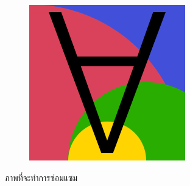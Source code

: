 \documentclass[xcolor=dvipsnames, xetex,serif]{beamer}
\numberwithin{equation}{section}
\begin{document}
\begin{frame}
\begin{figure}[H]
\begin{subfigure}{0.3\linewidth}
					\includegraphics[width=0.7\linewidth]{images/image_inpaint_synthetic/case05-toinpaint.png}
				\end{subfigure}
				\caption{ภาพที่จะทำการซ่อมแซม}
			\end{figure}
		\end{frame}
\end{document}
